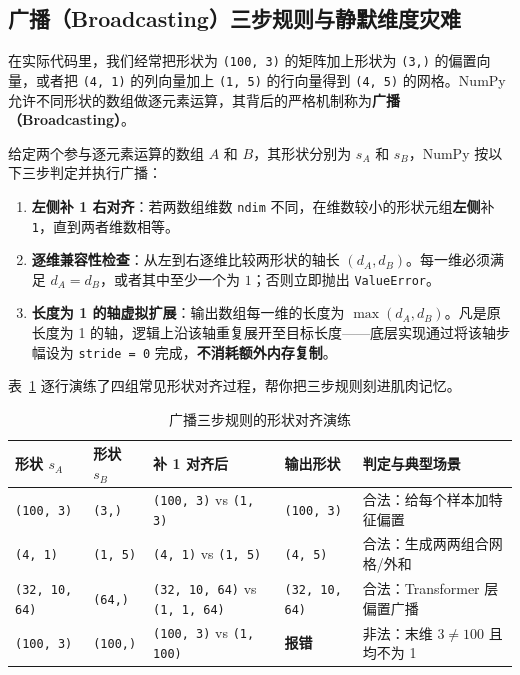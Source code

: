 \subsection{广播（Broadcasting）三步规则与静默维度灾难}

在实际代码里，我们经常把形状为 \texttt{(100, 3)} 的矩阵加上形状为 \texttt{(3,)} 的偏置向量，或者把 \texttt{(4, 1)} 的列向量加上 \texttt{(1, 5)} 的行向量得到 \texttt{(4, 5)} 的网格。NumPy 允许不同形状的数组做逐元素运算，其背后的严格机制称为\textbf{广播（Broadcasting）}。

\begin{defBox}
\begin{definition}\label{def:broadcasting}
给定两个参与逐元素运算的数组 $A$ 和 $B$，其形状分别为 $s_A$ 和 $s_B$，NumPy 按以下三步判定并执行广播：
\begin{enumerate}
  \item \textbf{左侧补 1 右对齐}：若两数组维数 \texttt{ndim} 不同，在维数较小的形状元组\textbf{左侧}补 \texttt{1}，直到两者维数相等。
  \item \textbf{逐维兼容性检查}：从左到右逐维比较两形状的轴长 $(d_A, d_B)$。每一维必须满足 $d_A = d_B$，或者其中至少一个为 $1$；否则立即抛出 \texttt{ValueError}。
  \item \textbf{长度为 1 的轴虚拟扩展}：输出数组每一维的长度为 $\max(d_A, d_B)$。凡是原长度为 1 的轴，逻辑上沿该轴重复展开至目标长度——底层实现通过将该轴步幅设为 \texttt{stride = 0} 完成，\textbf{不消耗额外内存复制}。
\end{enumerate}
\end{definition}
\end{defBox}

表~\ref{tab:broadcast-examples} 逐行演练了四组常见形状对齐过程，帮你把三步规则刻进肌肉记忆。

\begin{table}[htbp]
\centering
\caption{广播三步规则的形状对齐演练}\label{tab:broadcast-examples}
{\small
\begin{tabularx}{\linewidth}{@{}p{26mm}p{22mm}p{26mm}p{24mm}X@{}}
\toprule
\textbf{形状 $s_A$} & \textbf{形状 $s_B$} & \textbf{补 1 对齐后} & \textbf{输出形状} & \textbf{判定与典型场景} \\
\midrule
\texttt{(100, 3)} & \texttt{(3,)} & \texttt{(100, 3)} vs \texttt{(1, 3)} & \texttt{(100, 3)} & 合法：给每个样本加特征偏置 \\
\texttt{(4, 1)} & \texttt{(1, 5)} & \texttt{(4, 1)} vs \texttt{(1, 5)} & \texttt{(4, 5)} & 合法：生成两两组合网格/外和 \\
\texttt{(32, 10, 64)} & \texttt{(64,)} & \texttt{(32, 10, 64)} vs \texttt{(1, 1, 64)} & \texttt{(32, 10, 64)} & 合法：Transformer 层偏置广播 \\
\texttt{(100, 3)} & \texttt{(100,)} & \texttt{(100, 3)} vs \texttt{(1, 100)} & \textcolor{ochre}{\textbf{报错}} & 非法：末维 $3 \neq 100$ 且均不为 1 \\
\bottomrule
\end{tabularx}}
\end{table}

